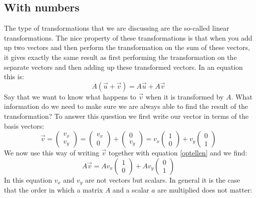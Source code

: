 \documentclass[a4paper]{report}
\begin{document}
\subsection{With numbers}
The type of transformations that we are discussing are the so-called linear transformations. The nice property of these transformations is that when you add up two vectors and then perform the transformation on the sum of these vectors, it gives exactly the same result as first performing the transformation on the separate vectors and then adding up these transformed vectors. In an equation this is:
\begin{equation}
A(\vec{u} + \vec{v}) = A\vec{u} + A\vec{v}
\label{optellen}
\end{equation}
Say that we want to know what happens to $\vec{v}$ when it is transformed by $A$. What information do we need to make sure we are always able to find the result of the transformation? To answer this question we first write our vector in terms of the basis vectors:
\begin{equation}
\vec{v} = \begin{pmatrix} v_x \\ v_y \end{pmatrix} = \begin{pmatrix} v_x \\ 0 \end{pmatrix} + \begin{pmatrix} 0 \\v_y \end{pmatrix} = v_x \begin{pmatrix} 1 \\ 0 \end{pmatrix} + v_y \begin{pmatrix} 0 \\ 1 \end{pmatrix}
\end{equation}
We now use this way of writing $\vec{v}$ together with equation \ref{optellen} and we find:
\begin{equation}
A\vec{v}  =  A v_x \begin{pmatrix} 1 \\ 0 \end{pmatrix} + A v_y \begin{pmatrix} 0 \\ 1 \end{pmatrix}
\label{tofu}
\end{equation}
In this equation $v_x$ and $v_y$ are not vectors but scalars. In general it is the case that the order in which a matrix $A$ and a scalar $a$ are multiplied does not matter:
\end{document}
